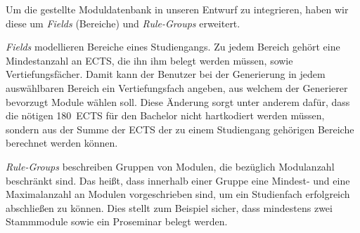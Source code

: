 Um die gestellte Moduldatenbank in unseren Entwurf zu integrieren, haben wir diese um \textit{Fields} (Bereiche) und \textit{Rule-Groups} erweitert.

\textit{Fields} modellieren Bereiche eines Studiengangs. Zu jedem Bereich gehört eine Mindestanzahl an ECTS, die ihn ihm belegt werden müssen, sowie Vertiefungsfächer. Damit kann der Benutzer bei der Generierung in jedem auswählbaren Bereich ein Vertiefungsfach angeben, aus welchem der Generierer bevorzugt Module wählen soll. Diese Änderung sorgt unter anderem dafür, dass die nötigen 180~ECTS für den Bachelor nicht hartkodiert werden müssen, sondern aus der Summe der ECTS der zu einem Studiengang gehörigen Bereiche berechnet werden können.

\textit{Rule-Groups} beschreiben Gruppen von Modulen, die bezüglich Modulanzahl beschränkt sind. Das heißt, dass innerhalb einer Gruppe eine Mindest- und eine Maximalanzahl an Modulen vorgeschrieben sind, um ein Studienfach erfolgreich abschließen zu können. Dies stellt zum Beispiel sicher, dass mindestens zwei Stammmodule sowie ein Proseminar belegt werden.